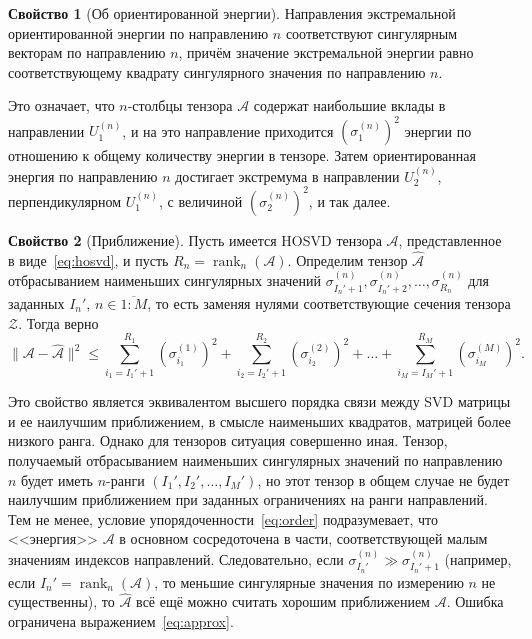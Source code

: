 \documentclass[specialist,
    substylefile = spbu.rtx,
    subf,href,colorlinks=true, 12pt]{disser}
\theoremstyle{plain}
\theoremstyle{definition}
\newtheorem{property}{Свойство}[section]
\theoremstyle{remark}
\begin{document}
    \begin{property}[Об ориентированной энергии]
        \label{property:oriented-energy}
        Направления экстремальной ориентированной энергии по направлению $n$ соответствуют сингулярным векторам по направлению $n$,
        причём значение экстремальной энергии равно соответствующему квадрату сингулярного значения по направлению $n$.
    \end{property}

    Это означает, что $n$-столбцы тензора $\mathcal{A}$ содержат наибольшие вклады в
    направлении $U^{(n)}_1$, и
    на это направление приходится $\left(\sigma^{(n)}_1\right)^2$ энергии по отношению к общему количеству энергии в тензоре.
    Затем ориентированная энергия по направлению $n$ достигает экстремума в направлении $U^{(n)}_2$,
    перпендикулярном $U^{(n)}_1$, с величиной $\left(\sigma^{(n)}_2\right)^2$, и так далее.

    \begin{property}[Приближение]
        \label{property:approx}
        Пусть имеется HOSVD тензора $\mathcal{A}$, представленное в виде~\eqref{eq:hosvd}, и пусть $R_n=\operatorname{rank}_n(\mathcal{A})$.
        Определим тензор $\hat{\mathcal{A}}$ отбрасыванием наименьших сингулярных значений $\sigma_{I_{n}'+1}^{(n)}, \sigma_{I_{n}'+2}^{(n)},\ldots, \sigma_{R_n}^{(n)}$
        для заданных $I_{n}'$, $n \in \overline{1:M}$, то есть заменяя нулями соответствующие сечения тензора $\mathcal{Z}$.
        Тогда верно
        \begin{equation}
            \|\mathcal{A}-\hat{\mathcal{A}}\|^2\leqslant \sum_{i_1=I_{1}'+1}^{R_1}\left( \sigma_{i_1}^{(1)}\right)^2 +
            \sum_{i_2=I_{2}'+1}^{R_2}\left( \sigma_{i_2}^{(2)}\right)^2 + \ldots + \sum_{i_M=I_{M}'+1}^{R_M}\left( \sigma_{i_M}^{(M)}\right)^2.\label{eq:approx}
        \end{equation}
    \end{property}

    Это свойство является эквивалентом высшего порядка связи между SVD матрицы и ее наилучшим приближением,
    в смысле наименьших квадратов, матрицей более низкого ранга.
    Однако для тензоров ситуация совершенно иная.
    Тензор, получаемый отбрасыванием наименьших сингулярных значений по направлению $n$ будет иметь 
    $n$-ранги $(I_1', I_2', \ldots, I_M')$, но этот тензор в общем случае не будет наилучшим приближением при
    заданных ограничениях на ранги направлений.
    Тем не менее, условие упорядоченности~\eqref{eq:order} подразумевает, что <<энергия>> $\mathcal{A}$ в основном сосредоточена в части,
    соответствующей малым значениям индексов направлений.
    Следовательно, если $\sigma^{(n)}_{I_n'} \gg \sigma^{(n)}_{I_n'+1}$ (например, если $I_n'=\operatorname{rank}_n(\mathcal{A})$,
    то меньшие сингулярные значения по измерению $n$ не существенны), то $\hat{\mathcal{A}}$ всё ещё можно считать хорошим приближением $\mathcal{A}$.
    Ошибка ограничена выражением~\eqref{eq:approx}.
    
\end{document}
